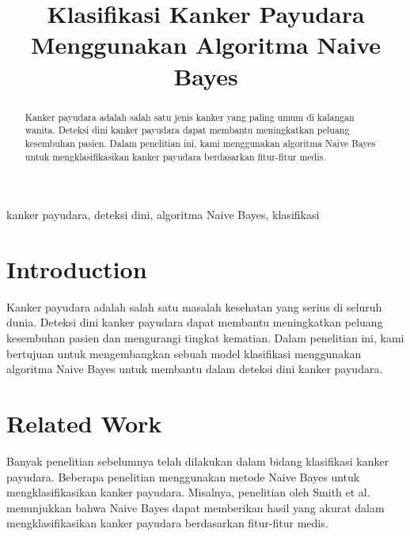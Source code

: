 \documentclass[conference]{IEEEtran}
\begin{document}
\title{Klasifikasi Kanker Payudara Menggunakan Algoritma Naive Bayes}

\author{
\and

\and
}
\maketitle

\begin{abstract}
Kanker payudara adalah salah satu jenis kanker yang paling umum di kalangan wanita. Deteksi dini kanker payudara dapat membantu meningkatkan peluang kesembuhan pasien. Dalam penelitian ini, kami menggunakan algoritma Naive Bayes untuk mengklasifikasikan kanker payudara berdasarkan fitur-fitur medis.
\end{abstract}

\begin{IEEEkeywords}
kanker payudara, deteksi dini, algoritma Naive Bayes, klasifikasi
\end{IEEEkeywords}

\section{Introduction} \label{sec:introduction}
Kanker payudara adalah salah satu masalah kesehatan yang serius di seluruh dunia. Deteksi dini kanker payudara dapat membantu meningkatkan peluang kesembuhan pasien dan mengurangi tingkat kematian. Dalam penelitian ini, kami bertujuan untuk mengembangkan sebuah model klasifikasi menggunakan algoritma Naive Bayes untuk membantu dalam deteksi dini kanker payudara.

\section{Related Work} \label{sec:related-work}
Banyak penelitian sebelumnya telah dilakukan dalam bidang klasifikasi kanker payudara. Beberapa penelitian menggunakan metode Naive Bayes untuk mengklasifikasikan kanker payudara. Misalnya, penelitian oleh Smith et al. \cite{smith2017} menunjukkan bahwa Naive Bayes dapat memberikan hasil yang akurat dalam mengklasifikasikan kanker payudara berdasarkan fitur-fitur medis.
\end{document}
